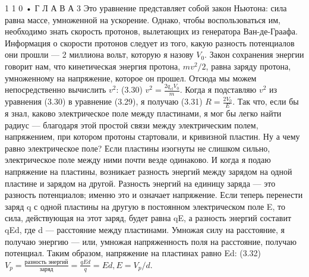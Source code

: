 \documentclass[10pt,oneside]{article}
\begin{document}
1 1 0 • Г Л А В А  3 Это уравнение представляет собой закон Ньютона: сила равна массе, умноженной на ускорение. Однако, чтобы воспользоваться им, необходимо знать скорость протонов, вылетающих из генератора Ван-де-Граафа. Информация о скорости протонов следует из того, какую разность потенциалов они прошли --- 2 миллиона вольт, которую я назову \(V_0\). Закон сохранения энергии говорит нам, что кинетическая энергия протона, \(mv^2/2\), равна заряду протона, умноженному на напряжение, которое он прошел. Отсюда мы можем непосредственно вычислить \(v^2\): (3.30) \(v^2 = \frac{2 q_{el} V_0}{m}\). Когда я подставляю \(v^2\) из уравнения (3.30) в уравнение (3.29), я получаю (3.31) \(R = \frac{2 V_0}{E}\). Так что, если бы я знал, каково электрическое поле между пластинами, я мог бы легко найти радиус --- благодаря этой простой связи между электрическим полем, напряжением, при котором протоны стартовали, и кривизной пластин. Ну а чему равно электрическое поле? Если пластины изогнуты не слишком сильно, электрическое поле между ними почти везде одинаково. И когда я подаю напряжение на пластины, возникает разность энергий между зарядом на одной пластине и зарядом на другой. Разность энергий на единицу заряда --- это разность потенциалов; именно это и означает напряжение. Если теперь перенести заряд q с одной пластины на другую в постоянном электрическом поле E, то сила, действующая на этот заряд, будет равна qE, а разность энергий составит qEd, где d --- расстояние между пластинами. Умножая силу на расстояние, я получаю энергию --- или, умножая напряженность поля на расстояние, получаю потенциал. Таким образом, напряжение на пластинах равно Ed: (3.32) \(V_p = \frac{\text{разность энергий}}{\text{заряд}} = \frac{qEd}{q} = Ed, E = V_p/d\).\par
\end{document}
